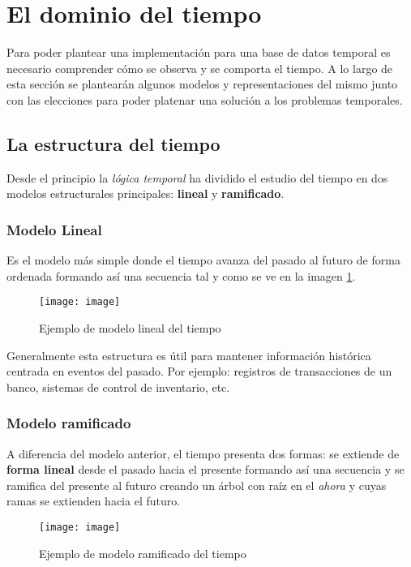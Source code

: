 \documentclass[11pt]{article}
\begin{document}
\section{El dominio del tiempo}

Para poder plantear una implementación para una base de datos temporal es necesario comprender cómo se observa y se comporta el tiempo.
A lo largo de esta sección se plantearán algunos modelos y representaciones del mismo junto con
las elecciones para poder platenar una solución a los problemas temporales.

\subsection{La estructura del tiempo}

Desde el principio la \textit{lógica temporal} ha dividido el estudio del tiempo en dos modelos estructurales principales:
\textbf{lineal} y \textbf{ramificado}.

\subsubsection{Modelo Lineal}

Es el modelo más simple donde el tiempo avanza del pasado al futuro de forma ordenada formando así una secuencia
tal y como se ve en la imagen \ref{fig:linear_time_model}.

\begin{figure}[h!]
    \centering
    \texttt{[image: image]}
    \caption{Ejemplo de modelo lineal del tiempo}
    \label{fig:linear_time_model}
\end{figure}

Generalmente esta estructura es útil para mantener información histórica centrada en eventos del pasado.
Por ejemplo: registros de transacciones de un banco, sistemas de control de inventario, etc.

\subsubsection{Modelo ramificado}

A diferencia del modelo anterior, el tiempo presenta dos formas:
se extiende de \textbf{forma lineal} desde el pasado hacia el presente formando así una secuencia
y se ramifica del presente al futuro creando un árbol con raíz en el \textit{ahora} y cuyas ramas se extienden hacia el futuro.

\begin{figure}[h!]
    \centering
    \texttt{[image: image]}
    \caption{Ejemplo de modelo ramificado del tiempo}
    \label{fig:branched_time_model}
\end{figure}
\end{document}
